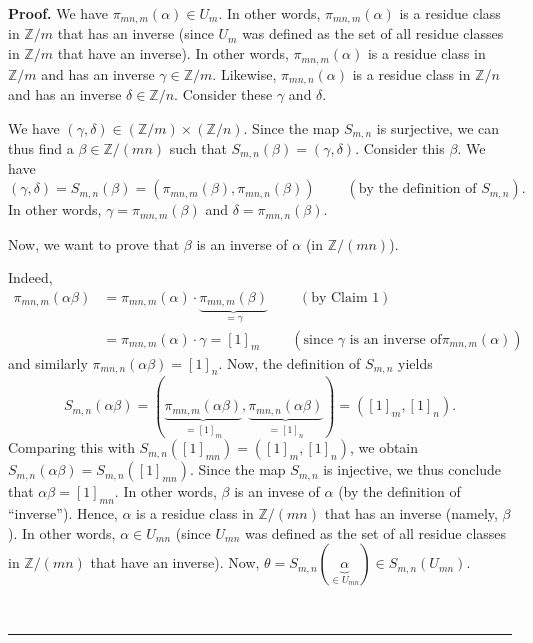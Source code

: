 \documentclass[numbers=enddot,12pt,final,onecolumn,notitlepage]{scrartcl}%
\numberwithin{exer}{subsection}
\theoremstyle{definition}
\newenvironment{proof}[1][Proof]{\noindent\textbf{#1.} }{\ \rule{0.5em}{0.5em}}
\begin{document}
\begin{proof}
We have $\pi_{mn,m}\left(  \alpha\right)  \in U_{m}$. In other words,
$\pi_{mn,m}\left(  \alpha\right)  $ is a residue class in $\mathbb{Z}/m$ that
has an inverse (since $U_{m}$ was defined as the set of all residue classes in
$\mathbb{Z}/m$ that have an inverse). In other words, $\pi_{mn,m}\left(
\alpha\right)  $ is a residue class in $\mathbb{Z}/m$ and has an inverse
$\gamma\in\mathbb{Z}/m$. Likewise, $\pi_{mn,n}\left(  \alpha\right)  $ is a
residue class in $\mathbb{Z}/n$ and has an inverse $\delta\in\mathbb{Z}/n$.
Consider these $\gamma$ and $\delta$.

We have $\left(  \gamma,\delta\right)  \in\left(  \mathbb{Z}/m\right)
\times\left(  \mathbb{Z}/n\right)  $. Since the map $S_{m,n}$ is surjective,
we can thus find a $\beta\in\mathbb{Z}/\left(  mn\right)  $ such that
$S_{m,n}\left(  \beta\right)  =\left(  \gamma,\delta\right)  $. Consider this
$\beta$. We have%
\[
\left(  \gamma,\delta\right)  =S_{m,n}\left(  \beta\right)  =\left(
\pi_{mn,m}\left(  \beta\right)  ,\pi_{mn,n}\left(  \beta\right)  \right)
\ \ \ \ \ \ \ \ \ \ \left(  \text{by the definition of }S_{m,n}\right)  .
\]
In other words, $\gamma=\pi_{mn,m}\left(  \beta\right)  $ and $\delta
=\pi_{mn,n}\left(  \beta\right)  $.

Now, we want to prove that $\beta$ is an inverse of $\alpha$ (in
$\mathbb{Z}/\left(  mn\right)  $).

Indeed,
\begin{align*}
\pi_{mn,m}\left(  \alpha\beta\right)   &  =\pi_{mn,m}\left(  \alpha\right)
\cdot\underbrace{\pi_{mn,m}\left(  \beta\right)  }_{=\gamma}%
\ \ \ \ \ \ \ \ \ \ \left(  \text{by Claim 1}\right) \\
&  =\pi_{mn,m}\left(  \alpha\right)  \cdot\gamma=\left[  1\right]
_{m}\ \ \ \ \ \ \ \ \ \ \left(  \text{since }\gamma\text{ is an inverse of
}\pi_{mn,m}\left(  \alpha\right)  \right)
\end{align*}
and similarly $\pi_{mn,n}\left(  \alpha\beta\right)  =\left[  1\right]  _{n}$.
Now, the definition of $S_{m,n}$ yields%
\[
S_{m,n}\left(  \alpha\beta\right)  =\left(  \underbrace{\pi_{mn,m}\left(
\alpha\beta\right)  }_{=\left[  1\right]  _{m}},\underbrace{\pi_{mn,n}\left(
\alpha\beta\right)  }_{=\left[  1\right]  _{n}}\right)  =\left(  \left[
1\right]  _{m},\left[  1\right]  _{n}\right)  .
\]
Comparing this with $S_{m,n}\left(  \left[  1\right]  _{mn}\right)  =\left(
\left[  1\right]  _{m},\left[  1\right]  _{n}\right)  $, we obtain
$S_{m,n}\left(  \alpha\beta\right)  =S_{m,n}\left(  \left[  1\right]
_{mn}\right)  $. Since the map $S_{m,n}$ is injective, we thus conclude that
$\alpha\beta=\left[  1\right]  _{mn}$. In other words, $\beta$ is an invese of
$\alpha$ (by the definition of \textquotedblleft inverse\textquotedblright).
Hence, $\alpha$ is a residue class in $\mathbb{Z}/\left(  mn\right)  $ that
has an inverse (namely, $\beta$). In other words, $\alpha\in U_{mn}$ (since
$U_{mn}$ was defined as the set of all residue classes in $\mathbb{Z}/\left(
mn\right)  $ that have an inverse). Now, $\theta=S_{m,n}\left(
\underbrace{\alpha}_{\in U_{mn}}\right)  \in S_{m,n}\left(  U_{mn}\right)  $.


\end{proof}
\end{document}
